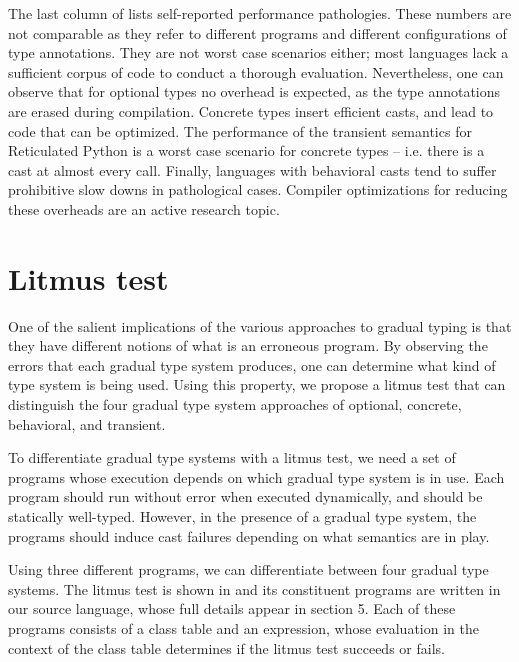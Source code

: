 \documentclass[a4paper,USenglish]{tex/lipics-v2016}
\begin{document}
The last column of  lists self-reported performance
pathologies.  These numbers are not comparable as they refer to different
programs and different configurations of type annotations. They are not
worst case scenarios either; most languages lack a sufficient corpus of code
to conduct a thorough evaluation.  Nevertheless, one can observe that for
optional types no overhead is expected, as the type annotations are erased
during compilation. Concrete types insert efficient casts, and lead to code
that can be optimized.  The performance of the transient semantics for
Reticulated Python is a worst case scenario for concrete types -- i.e. there
is a cast at almost every call. Finally, languages with behavioral casts
tend to suffer prohibitive slow downs in pathological cases. Compiler
optimizations for reducing these overheads are an active research topic.



\section{Litmus test}\label{litmustest}


One of the salient implications of the various approaches to gradual typing is
that they have different notions of what is an erroneous program. By observing
the errors that each gradual type system produces, one can determine what kind
of type system is being used. Using this property, we propose a litmus test
that can distinguish the four gradual type system approaches of optional, concrete, 
behavioral, and transient.

To differentiate gradual type systems with a litmus test, we need a set of
programs whose execution depends on which gradual type system is in use. Each
program should run without error when executed dynamically, and should be
statically well-typed. However, in the presence of a gradual type system, the
programs should induce cast failures depending on what semantics are in play.

Using three different programs, we can differentiate between four gradual type
systems. The litmus test is shown in  and its constituent
programs are written in our source language, whose full details appear in 
section 5. Each of these programs consists of a class table and an expression,
whose evaluation in the context of the class table determines if the litmus test
succeeds or fails.
\end{document}

